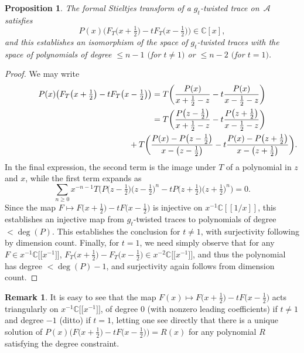 \documentclass[10pt,a4paper]{amsart}
\newcommand{\CN}{\mathbb{C}} %
\newcommand{\mc}[1]{\mathcal{#1}}
\newtheorem{Proposition}[Theorem]{Proposition}
\theoremstyle{definition}
\newtheorem{Remark}[Theorem]{Remark}
\numberwithin{equation}{section}
\begin{document}
\begin{Proposition}
 The formal Stieltjes transform of a $g_t$-twisted trace on~$\mc A$
 satisfies
 \[
 P(x)\big(F_T\big(x+\tfrac{1}{2}\big)-t F_T\big(x-\tfrac{1}{2}\big)\big)\in \CN[x],
 \]
 and this establishes an isomorphism of the space of $g_t$-twisted traces
 with the space of polynomials of degree $\le n-1$ $($for $t\ne 1)$ or $\le
 n-2$ $($for $t=1)$.
\end{Proposition}

\begin{proof}
 We may write
 \begin{gather*}
 P(x)\big(F_T\big(x+\tfrac{1}{2}\big) - t F_T\big(x-\tfrac{1}{2}\big)\big)
 = T\bigg(\frac{P(x)}{x+\frac{1}{2}-z}-t \frac{P(x)}{x-\frac{1}{2}-z}\bigg)
 \\ \hphantom{ P(x)\big(F_T\big(x+\tfrac{1}{2}\big) - t F_T\big(x-\tfrac{1}{2}\big)\big)}
 {}= T\bigg(\frac{P\big(z-\frac{1}{2}\big)}{x+\frac{1}{2}-z}-t \frac{P\big(z+\frac{1}{2}\big)}{x-\frac{1}{2}-z}\bigg)
 \\ \hphantom{ P(x)\big(F_T\big(x+\tfrac{1}{2}\big) - t F_T\big(x-\tfrac{1}{2}\big)\big)=}
{}+ T\bigg(\frac{P(x)-P\big(z-\frac{1}{2}\big)}{x-\big(z-\frac{1}{2}\big)}-t \frac{P(x)-P\big(z+\frac{1}{2}\big)}{x-\big(z+\frac{1}{2}\big)}\bigg).
 \end{gather*}
 In the final expression, the second term is the image under $T$ of a
 polynomial in $z$ and $x$, while the first term expands as
 \[
 \sum_{n\ge 0} x^{-n-1} T\big(P\big(z-\tfrac{1}{2}\big)\big(z-\tfrac{1}{2}\big)^n-t P\big(z+\tfrac{1}{2}\big)\big(z+\tfrac{1}{2}\big)^n\big) = 0.
 \]
 Since the map $F\mapsto F\big(x+\tfrac{1}{2}\big)-t F\big(x-\tfrac{1}{2}\big)$ is injective on $x^{-1}\mathbb C[[1/x]]$, this establishes an
 injective map from $g_t$-twisted traces to polynomials of degree
 $<\deg(P)$. This establishes the conclusion for $t\ne 1$, with surjectivity following by dimension count.
 Finally, for $t=1$, we need simply observe that for any $F\in x^{-1}\CN\big[\big[x^{-1}\big]\big]$,
 $F_T\big(x+\frac{1}{2}\big)-F_T\big(x-\tfrac{1}{2}\big)\in x^{-2}\CN\big[\big[x^{-1}\big]\big]$, and thus the polynomial has
 degree $<\deg(P)-1$, and surjectivity again follows from dimension count.
\end{proof}

\begin{Remark} It is easy to see that the map $F(x)\mapsto F\big(x+\frac{1}{2}\big)-t F\big(x-\tfrac{1}{2}\big)$ acts triangularly
 on $x^{-1}\CN\big[\big[x^{-1}\big]\big]$, of degree $0$ (with nonzero leading coefficients)
 if $t\ne 1$ and degree $-1$ (ditto) if $t=1$, letting one see directly
 that there is a unique solution of $P(x)\big(F\big(x+\frac{1}{2}\big)-t F\big(x-\tfrac{1}{2}\big)\big)=R(x)$
 for any polynomial $R$ satisfying the degree constraint.
\end{Remark}
\end{document}
